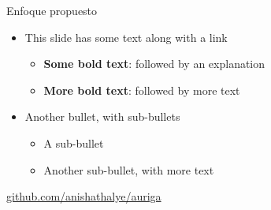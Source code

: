 \begin{frame}{\color{blue}Enfoque propuesto}


  

  
  \begin{itemize}
  \item This slide has some text along with a link
    \begin{itemize}
    \item \textbf{Some bold text}: followed by an explanation
    \item \textbf{More bold text}: followed by more text
    \end{itemize}
  \item Another bullet, with sub-bullets
    \begin{itemize}
    \item A sub-bullet
    \item Another sub-bullet, with more text
    \end{itemize}
  \end{itemize}
  
  \vspace{2ex}
  \begin{center}
    \color{blue} \href{https://github.com/anishathalye/auriga}{github.com/anishathalye/auriga}
  \end{center}
  
\end{frame}
